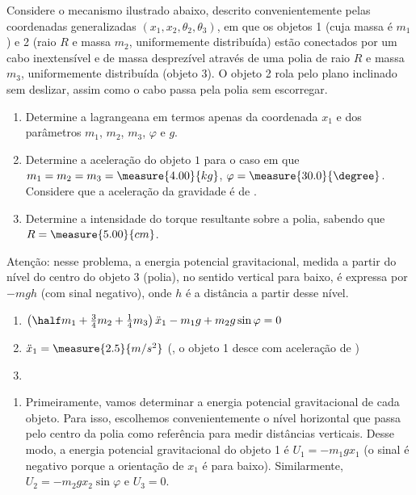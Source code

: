 \begin{question}
	Considere o mecanismo ilustrado abaixo, descrito convenientemente pelas coordenadas generalizadas $(x_1, x_2, \theta_2, \theta_3)$, em que os objetos 1 (cuja massa é $m_1$) e 2 (raio $R$ e massa $m_2$, uniformemente distribuída) estão conectados por um cabo inextensível e de massa desprezível através de uma polia de raio $R$ e massa $m_3$, uniformemente distribuída (objeto 3).
	O objeto 2 rola pelo plano inclinado sem deslizar, assim como o cabo passa pela polia sem escorregar.

	\begin{enumerate}
		\item Determine a lagrangeana em termos apenas da coordenada $x_1$ e dos parâmetros $m_1$, $m_2$, $m_3$, $\varphi$ e $g$.
		\item Determine a aceleração do objeto $1$ para o caso em que $m_1 = m_2 = m_3 = \measure{4.00}{kg}$, $\varphi = \measure{30.0}{\degree}$.
		Considere que a aceleração da gravidade é de .
		\item Determine a intensidade do torque resultante sobre a polia, sabendo que $R = \measure{5.00}{cm}$.
	\end{enumerate}


	\begin{compactdesc}
		\item[Atenção:] nesse problema, a energia potencial gravitacional, medida a partir do nível do centro do objeto 3 (polia), no sentido vertical para baixo, é expressa por $-mgh$ (com sinal negativo), onde $h$ é a distância a partir desse nível.
	\end{compactdesc}

	\begin{answer}
		\begin{enumerate}
			\item $\left(\half m_1 + \frac{3}{4}m_2 + \frac{1}{4}m_3\right)\ddot x_1 - m_1 g + m_2 g \sin \varphi = 0$
			\item $\ddot x_1 = \measure{2.5}{m/s^2}$ (\ie, o objeto 1 desce com aceleração de )
			\item {}
		\end{enumerate}
	\end{answer}


	\begin{solution}
		\begin{enumerate}
			\item Primeiramente, vamos determinar a energia potencial gravitacional de cada objeto.
			Para isso, escolhemos convenientemente o nível horizontal que passa pelo centro da polia como referência para medir distâncias verticais.
			Desse modo, a energia potencial gravitacional do objeto 1 é $U_1 = -m_1gx_1$ (o sinal é negativo porque a orientação de $x_1$ é para baixo).
			Similarmente, $U_2 = -m_2gx_2\sin\varphi$ e $U_3 = 0$.


\end{enumerate}
\end{solution}
\end{question}
